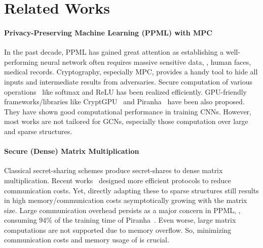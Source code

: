 \section{Related Works}
\label{supp::work}
 
\paragraph{Privacy-Preserving Machine Learning (PPML) with MPC}
In the past decade, PPML has gained great attention as establishing a well-performing neural network often requires massive sensitive data, \eg, human faces, medical records.
Cryptography, especially MPC,
provides a handy tool to 
hide all inputs and intermediate results from adversaries.
Secure computation of various operations~\cite{ndss/ABY15,ccs/ABY318,neurips/crypten2020,ccs/RatheeRKCGRS20,sp21/TanKTW,uss/WatsonWP22,acsac/0021ZCPTLY23,adma/ZhengSDCLZW23} like softmax
and ReLU has been realized efficiently.
GPU-friendly frameworks/libraries like %
CryptGPU~\cite{sp21/TanKTW} and Piranha~\cite{uss/WatsonWP22} have been also proposed.
They have shown good computational performance in training CNNs.
However, most works are not tailored for %
GCNs, especially those computation over large and sparse structures.

\paragraph{Secure (Dense) Matrix Multiplication}
Classical secret-sharing schemes produce secret-shares to dense matrix multiplication.
Recent works~\cite{sp/MohasselZ17,asiaccs/MonoG23,asiacrypt/0030KRRSW20,ccs/JiangKLS18} designed more efficient protocols to reduce communication costs.
Yet, directly adapting these to sparse structures still results in high memory/communication costs asymptotically growing with the matrix size.
Large communication overhead persists as a major concern in PPML, \eg, consuming $94\%$ of the training time of Piranha~\cite{uss/WatsonWP22}.
Even worse, large matrix computations are not supported due to memory overflow.
So, minimizing communication costs and memory usage of \osmm is crucial.

